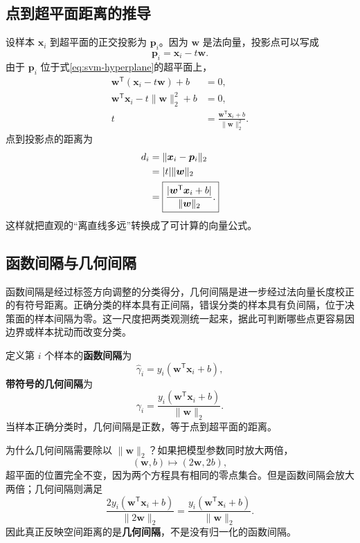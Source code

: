 \subsection{点到超平面距离的推导}

设样本 $\boldsymbol x_i$ 到超平面的正交投影为 $\boldsymbol p_i$。因为 $\boldsymbol w$ 是法向量，投影点可以写成
\[
\boldsymbol p_i=\boldsymbol x_i-t\boldsymbol w.
\]
由于 $\boldsymbol p_i$ 位于式\eqref{eq:svm-hyperplane}的超平面上，
\begin{align*}
\boldsymbol w^{\mathsf T}(\boldsymbol x_i-t\boldsymbol w)+b&=0,\\
\boldsymbol w^{\mathsf T}\boldsymbol x_i-t\|\boldsymbol w\|_2^2+b&=0,\\
t&=\frac{\boldsymbol w^{\mathsf T}\boldsymbol x_i+b}
{\|\boldsymbol w\|_2^2}.
\end{align*}
点到投影点的距离为
\begin{align}
d_i
&=\|\boldsymbol x_i-\boldsymbol p_i\|_2\notag\\
&=|t|\|\boldsymbol w\|_2\notag\\
&=\boxed{\frac{|\boldsymbol w^{\mathsf T}\boldsymbol x_i+b|}
{\|\boldsymbol w\|_2}.}\label{eq:svm-point-distance}
\end{align}
这样就把直观的“离直线多远”转换成了可计算的向量公式。

\subsection{函数间隔与几何间隔}

函数间隔是经过标签方向调整的分类得分，几何间隔是进一步经过法向量长度校正的有符号距离。正确分类的样本具有正间隔，错误分类的样本具有负间隔，位于决策面的样本间隔为零。这一尺度把两类观测统一起来，据此可判断哪些点更容易因边界或样本扰动而改变分类。

定义第 $i$ 个样本的\textbf{函数间隔}为
\begin{equation}\label{eq:svm-functional-margin}
\hat\gamma_i=y_i(\boldsymbol w^{\mathsf T}\boldsymbol x_i+b),
\end{equation}
\textbf{带符号的几何间隔}为
\begin{equation}\label{eq:svm-geometric-margin}
\boxed{\gamma_i=\frac{y_i(\boldsymbol w^{\mathsf T}\boldsymbol x_i+b)}
{\|\boldsymbol w\|_2}.}
\end{equation}
当样本正确分类时，几何间隔是正数，等于点到超平面的距离。

为什么几何间隔需要除以 $\|\boldsymbol w\|_2$？如果把模型参数同时放大两倍，
\[
(\boldsymbol w,b)\longmapsto(2\boldsymbol w,2b),
\]
超平面的位置完全不变，因为两个方程具有相同的零点集合。但是函数间隔会放大两倍；几何间隔则满足
\[
\frac{2y_i(\boldsymbol w^{\mathsf T}\boldsymbol x_i+b)}
{\|2\boldsymbol w\|_2}
=\frac{y_i(\boldsymbol w^{\mathsf T}\boldsymbol x_i+b)}
{\|\boldsymbol w\|_2}.
\]
因此真正反映空间距离的是\textbf{几何间隔}，不是没有归一化的函数间隔。

